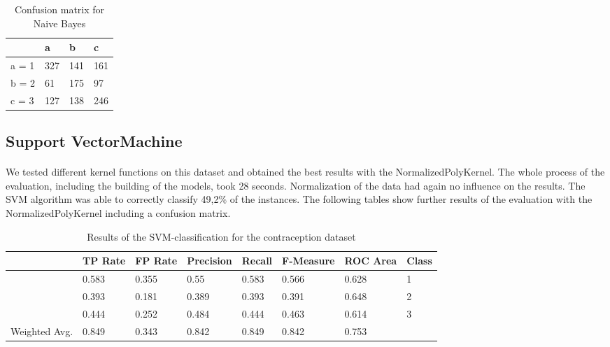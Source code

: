 \documentclass[paper=a4, fontsize=11pt]{scrartcl} %
\numberwithin{equation}{section} %
\numberwithin{figure}{section} %
\numberwithin{table}{section} %
\begin{document}
\begin{table}[h]
\centering
\begin{tabular}{|l|lll|}
\hline
              &   a &   b &   c  \\
\hline
 a = 1        & 327 & 141 & 161  \\
 b = 2        &  61 & 175 &  97  \\
 c = 3        & 127 & 138 & 246  \\
\hline
\end{tabular}
\caption{Confusion matrix for Naive Bayes}
\label{tab:contra:bayes:1c}
\end{table}


\subsection{Support VectorMachine}

\paragraph{}We tested different kernel functions on this dataset and obtained the best results with the NormalizedPolyKernel. The whole process of the evaluation, including the building of the models, took 28 seconds. Normalization of the data had again no influence on the results. The SVM algorithm was able to correctly classify 49,2\% of the instances. The following tables show further results of the evaluation with the NormalizedPolyKernel including a confusion matrix.

\begin{table}[h]
\centering
\begin{tabular}{|llllllll|}
	\hline
	&								TP Rate   	&FP Rate   &Precision   &Recall  &F-Measure   &ROC Area  	&Class\\
	\hline
									&0.583     	&0.355     &0.55      	&0.583   &0.566   		&0.628    	&1\\
                 	&0.393     	&0.181     &0.389     	&0.393   &0.391      	&0.648    	&2\\
                 	&0.444     	&0.252     &0.484     	&0.444   &0.463      	&0.614    	&3\\
  \hline
	Weighted Avg.   & 0.849    & 0.343      &0.842   &  0.849     &0.842     & 0.753			&\\
	\hline
\end{tabular}
\caption{Results of the SVM-classification for the contraception dataset}
\end{table}
\end{document}
